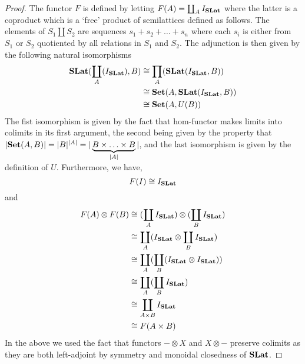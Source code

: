 \begin{proof}
	The functor $F$ is defined by letting $F(A) = \coprod_{A} I_{\mathbf{SLat}}$ where the latter is a coproduct which is a `free' product of semilattices defined as follows.
	The elements of $S_{1} \coprod S_{2}$ are sequences $s_{1} + s_{2} + \ldots + s_{n}$ where each $s_{i}$ is either from $S_{1}$ or $S_{2}$ quotiented by all relations in $S_{1}$ and $S_{2}$.
	The adjunction is then given by the following natural isomorphisms
	\begin{align*}
		\mathbf{SLat}(\coprod_{A}(I_{\mathbf{SLat}}), B) & \cong \prod_{A}(\mathbf{SLat}(I_{\mathbf{SLat}}, B))       \\
		                                                   & \cong \mathbf{Set}(A,\mathbf{SLat}(I_{\mathbf{SLat}}, B)) \\
		                                                   & \cong \mathbf{Set}(A, U(B))
	\end{align*}
	The fist isomorphism is given by the fact that hom-functor makes limits into colimits in its first argument, the second being given by the property that $|\mathbf{Set}(A,B)| = |B|^{|A|} = |\underbrace{B \times \ldots \times B}_{|A|}|$, and the last isomorphism is given by the definition of $U$.
	Furthermore, we have,
	\[
		F(I) \cong I_{\mathbf{SLat}}
	\]
	and
	\begin{align*}
		F(A) \otimes F(B) & \cong (\coprod_{A} I_{\mathbf{SLat}}) \otimes (\coprod_{B} I_{\mathbf{SLat}}) \\
		                  & \cong \coprod_{A} (I_{\mathbf{SLat}} \otimes \coprod_{B} I_{\mathbf{SLat}})   \\
		                  & \cong \coprod_{A} (\coprod_{B} (I_{\mathbf{SLat}} \otimes I_{\mathbf{SLat}})) \\
		                  & \cong \coprod_{A} (\coprod_{B} I_{\mathbf{SLat}})                              \\
		                  & \cong \coprod_{A \times B} I_{\mathbf{SLat}}                                   \\
		                  & \cong F(A \times B)
	\end{align*}
	In the above we used the fact that functors $- \otimes X$ and $X \otimes -$ preserve colimits as they are both left-adjoint by symmetry and monoidal closedness of $\mathbf{SLat}$.
\end{proof}

